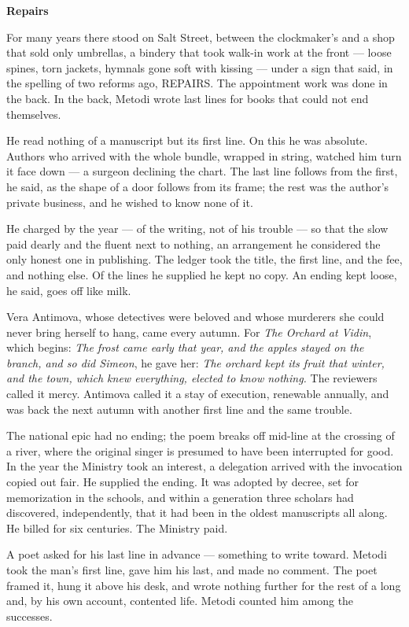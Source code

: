 \documentclass[11pt]{article}
\begin{document}
\begin{center}
{\LARGE\bfseries Repairs}
\end{center}
\bigskip
\noindent For many years there stood on Salt Street, between the clockmaker's and a shop that sold only umbrellas, a bindery that took walk-in work at the front — loose spines, torn jackets, hymnals gone soft with kissing — under a sign that said, in the spelling of two reforms ago, REPAIRS. The appointment work was done in the back. In the back, Metodi wrote last lines for books that could not end themselves.

He read nothing of a manuscript but its first line. On this he was absolute. Authors who arrived with the whole bundle, wrapped in string, watched him turn it face down — a surgeon declining the chart. The last line follows from the first, he said, as the shape of a door follows from its frame; the rest was the author's private business, and he wished to know none of it.

He charged by the year — of the writing, not of his trouble — so that the slow paid dearly and the fluent next to nothing, an arrangement he considered the only honest one in publishing. The ledger took the title, the first line, and the fee, and nothing else. Of the lines he supplied he kept no copy. An ending kept loose, he said, goes off like milk.

Vera Antimova, whose detectives were beloved and whose murderers she could never bring herself to hang, came every autumn. For \emph{The Orchard at Vidin}, which begins: \emph{The frost came early that year, and the apples stayed on the branch, and so did Simeon}, he gave her: \emph{The orchard kept its fruit that winter, and the town, which knew everything, elected to know nothing.} The reviewers called it mercy. Antimova called it a stay of execution, renewable annually, and was back the next autumn with another first line and the same trouble.

The national epic had no ending; the poem breaks off mid-line at the crossing of a river, where the original singer is presumed to have been interrupted for good. In the year the Ministry took an interest, a delegation arrived with the invocation copied out fair. He supplied the ending. It was adopted by decree, set for memorization in the schools, and within a generation three scholars had discovered, independently, that it had been in the oldest manuscripts all along. He billed for six centuries. The Ministry paid.

A poet asked for his last line in advance — something to write toward. Metodi took the man's first line, gave him his last, and made no comment. The poet framed it, hung it above his desk, and wrote nothing further for the rest of a long and, by his own account, contented life. Metodi counted him among the successes.
\end{document}
